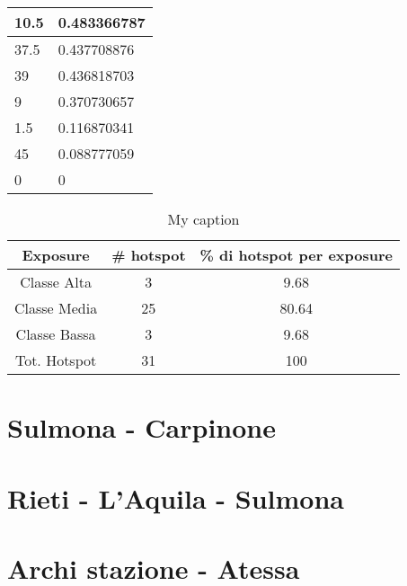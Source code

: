 \begin{table}[H]
\begin{tabular}{|l|l|}
		\rowcolor[HTML]{F8FF00} 
		10.5                                                      & 0.483366787                                                    \\ \hline
		\rowcolor[HTML]{F8FF00} 
		37.5                                                      & 0.437708876                                                    \\ \hline
		\rowcolor[HTML]{F8FF00} 
		39                                                        & 0.436818703                                                    \\ \hline
		\rowcolor[HTML]{F8FF00} 
		9                                                         & 0.370730657                                                    \\ \hline
		\rowcolor[HTML]{009901} 
		1.5                                                       & 0.116870341                                                    \\ \hline
		\rowcolor[HTML]{009901} 
		45                                                        & 0.088777059                                                    \\ \hline
		\rowcolor[HTML]{009901} 
		0                                                         & 0                                                              \\ \hline
	\end{tabular}
\end{table}

\begin{table}[H]
	\centering
	\caption{My caption}
	\label{risultati_roma_pescara}
	\begin{tabular}{|c|c|c|}
		\hline
		\rowcolor[HTML]{C0C0C0} 
		\textbf{Exposure} & \textbf{\# hotspot} & \textbf{\% di hotspot per exposure} \\ \hline
		Classe Alta       & 3                  & 9.68                                   \\ \hline
		Classe Media      & 25                 & 80.64                          \\ \hline
		Classe Bassa      & 3              & 9.68                               \\ \hline
		Tot. Hotspot      & 31               & 100                                 \\ \hline
	\end{tabular}
\end{table}

\section{Sulmona - Carpinone}

\section{Rieti - L'Aquila - Sulmona}

\section{Archi stazione - Atessa}